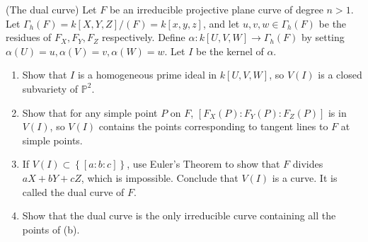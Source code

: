 \documentclass{solution}
\begin{document}
\begin{problem}{6.47}
    (The dual curve) Let $F$ be an irreducible projective plane curve of degree $n \gt 1$. Let $\Gamma_h(F) = k[X, Y, Z] / (F) = k[x, y, z]$, and let $u, v, w \in \Gamma_h(F)$ be the residues of $F_X, F_Y, F_Z$ respectively. Define $\alpha: k[U, V, W] \rightarrow \Gamma_h(F)$ by setting $\alpha(U) = u, \alpha(V) = v, \alpha(W) = w$. Let $I$ be the kernel of $\alpha$.
    \begin{enumerate}
        \item Show that $I$ is a homogeneous prime ideal in $k[U, V, W]$, so $V(I)$ is a closed subvariety of $\mathbb{P}^2$.
        \item Show that for any simple point $P$ on $F$, $[F_X(P): F_Y(P): F_Z(P)]$ is in $V(I)$, so $V(I)$ contains the points corresponding to tangent lines to $F$ at simple points.
        \item If $V(I) \subset \left\lbrace [a:b:c] \right\rbrace$, use Euler's Theorem to show that $F$ divides $aX + bY + cZ$, which is impossible. Conclude that $V(I)$ is a curve. It is called the dual curve of $F$.
        \item Show that the dual curve is the only irreducible curve containing all the points of (b). 
    \end{enumerate}
\end{problem}
\end{document}
